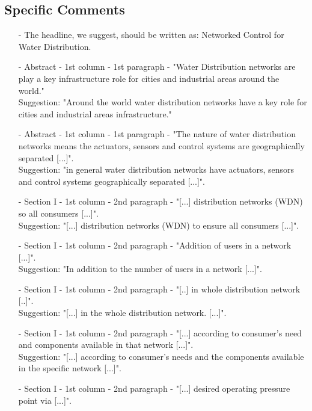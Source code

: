 \subsection{Specific Comments}
\begin{itemize}
\item[-]The headline, we suggest, should be written as: Networked Control for Water Distribution.
\item[-]Abstract - 1st column - 1st paragraph - "Water Distribution networks are play a key infrastructure role for cities and industrial areas around the world."\\
Suggestion: "Around the world water distribution networks have a key role for cities and industrial areas infrastructure."\\
\item[-]Abstract - 1st column - 1st paragraph - "The nature of water distribution networks means the actuators, sensors and control systems are geographically separated [...]".\\
Suggestion: "in general water distribution networks have actuators, sensors and control systems geographically separated [...]".\\
\item[-]Section I - 1st column - 2nd paragraph - "[...] distribution networks (WDN) so all consumers [...]".\\
Suggestion: "[...] distribution networks (WDN) to ensure all consumers [...]".\\
\item[-] Section I - 1st column - 2nd paragraph - "Addition of users in a network [...]".\\
Suggestion: "In addition to the number of users in a network [...]".\\
\item[-]Section I - 1st column - 2nd paragraph - "[..] in whole distribution network [..]".\\
Suggestion: "[...] in the whole distribution network. [...]".\\
\item[-]Section I - 1st column - 2nd paragraph - "[...] according to consumer's need and components available in that network [...]".\\
Suggestion: "[...] according to  consumer's needs and the components available in the specific network [...]".\\
\item[-]Section I - 1st column - 2nd paragraph - "[...] desired operating pressure point via [...]".\\

\end{itemize}
